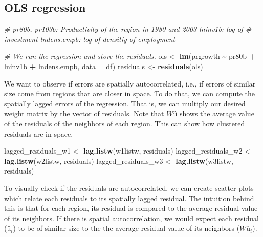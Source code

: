 \documentclass[
  a4paper,
]{article}
\newenvironment{Shaded}{\begin{snugshade}}{\end{snugshade}}
\newcommand{\AttributeTok}[1]{\textcolor[rgb]{0.13,0.29,0.53}{#1}}
\newcommand{\CommentTok}[1]{\textcolor[rgb]{0.56,0.35,0.01}{\textit{#1}}}
\newcommand{\FunctionTok}[1]{\textcolor[rgb]{0.13,0.29,0.53}{\textbf{#1}}}
\newcommand{\NormalTok}[1]{#1}
\newcommand{\OtherTok}[1]{\textcolor[rgb]{0.56,0.35,0.01}{#1}}
\newcommand{\SpecialCharTok}[1]{\textcolor[rgb]{0.81,0.36,0.00}{\textbf{#1}}}
\begin{document}
\subsection{OLS regression}\label{ols-regression}

\begin{Shaded}
\begin{Highlighting}[]
\CommentTok{\# pr80b, pr103b: Productivity of the region in 1980 and 2003 lninv1b: log of}
\CommentTok{\# investment lndens.empb: log of densitiy of employment}

\CommentTok{\# We run the regression and store the residuals.}
\NormalTok{ols }\OtherTok{\textless{}{-}} \FunctionTok{lm}\NormalTok{(prgrowth }\SpecialCharTok{\textasciitilde{}}\NormalTok{ pr80b }\SpecialCharTok{+}\NormalTok{ lninv1b }\SpecialCharTok{+}\NormalTok{ lndens.empb, }\AttributeTok{data =}\NormalTok{ df)}
\NormalTok{residuals }\OtherTok{\textless{}{-}} \FunctionTok{residuals}\NormalTok{(ols)}
\end{Highlighting}
\end{Shaded}

We want to observe if errors are spatially autocorrelated, i.e., if
errors of similar size come from regions that are closer in space. To do
that, we can compute the spatially lagged errors of the regression. That
is, we can multiply our desired weight matrix by the vector of
residuals. Note that \(Wû\) shows the average value of the residuals of
the neighbors of each region. This can show how clustered residuals are
in space.

\begin{Shaded}
\begin{Highlighting}[]
\NormalTok{lagged\_residuals\_w1 }\OtherTok{\textless{}{-}} \FunctionTok{lag.listw}\NormalTok{(w1listw, residuals)}
\NormalTok{lagged\_residuals\_w2 }\OtherTok{\textless{}{-}} \FunctionTok{lag.listw}\NormalTok{(w2listw, residuals)}
\NormalTok{lagged\_residuals\_w3 }\OtherTok{\textless{}{-}} \FunctionTok{lag.listw}\NormalTok{(w3listw, residuals)}
\end{Highlighting}
\end{Shaded}

To visually check if the residuals are autocorrelated, we can create
scatter plots which relate each residuals to its spatially lagged
residual. The intuition behind this is that for each region, its
residual is compared to the average residual value of its neighbors. If
there is spatial autocorrelation, we would expect each residual
(\(û_i\)) to be of similar size to the the average residual value of its
neighbors (\(Wû_i\)).
\end{document}
